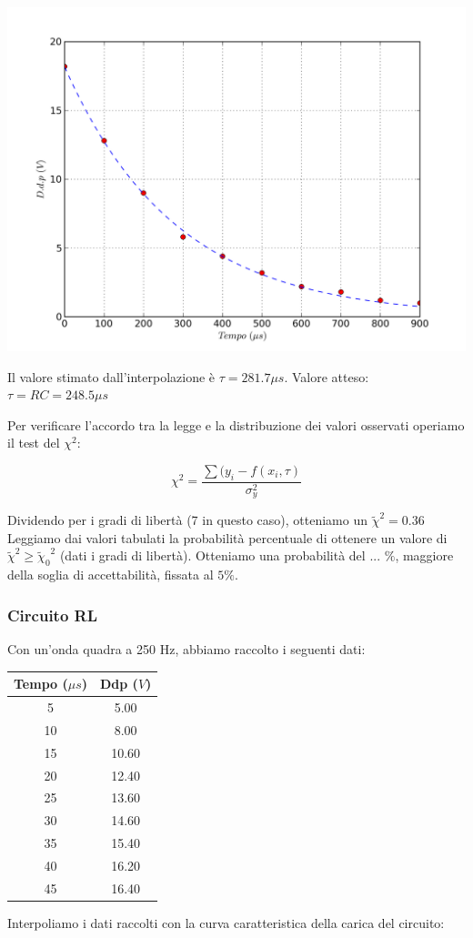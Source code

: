 \begin{center}
 \includegraphics[scale=0.70]{grafici/C3/fitcond.png}
\end{center}

Il valore stimato dall'interpolazione è $\tau=281.7 \mu s$.
Valore atteso: $\tau=RC=248.5 \mu s$

Per verificare l'accordo tra la legge e la distribuzione dei valori osservati operiamo il test del $\chi^2$:

$$ \chi^2 = \frac{\sum{(y_i - f(x_i,\tau )}}{\sigma_y^2} $$

Dividendo per i gradi di libertà (7 in questo caso), otteniamo un $\tilde{\chi}^2 = 0.36 $ \\
Leggiamo dai valori tabulati la probabilità percentuale di ottenere un valore di $\tilde{\chi}^2 \geq {\tilde{\chi}_0}^2 $ (dati i gradi di libertà). Otteniamo una probabilità del ... $\%$, maggiore della soglia di accettabilità, fissata al $5\%$. 


\subsubsection{Circuito RL}
Con un'onda quadra a 250 Hz, abbiamo raccolto i seguenti dati:

\begin{center}
\begin{tabular}{*{2}{c}}
Tempo ($\mu s$) & Ddp ($V$) \\
\midrule
5 & 5.00 \\
10 & 8.00 \\
15 & 10.60 \\
20 & 12.40 \\
25 & 13.60 \\
30 & 14.60 \\
35 & 15.40 \\
40 & 16.20 \\
45 & 16.40 \\
\end{tabular}
\end{center}
Interpoliamo i dati raccolti con la curva caratteristica della carica del circuito:

